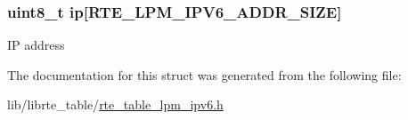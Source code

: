 \subsubsection[{ip}]{\setlength{\rightskip}{0pt plus 5cm}uint8\+\_\+t ip\mbox{[}R\+T\+E\+\_\+\+L\+P\+M\+\_\+\+I\+P\+V6\+\_\+\+A\+D\+D\+R\+\_\+\+S\+I\+Z\+E\mbox{]}}\label{structrte__table__lpm__ipv6__key_aa53c1fe193ed5311bd6c16153b939a10}
I\+P address 

The documentation for this struct was generated from the following file\+:\begin{DoxyCompactItemize}
\item 
lib/librte\+\_\+table/\hyperlink{rte__table__lpm__ipv6_8h}{rte\+\_\+table\+\_\+lpm\+\_\+ipv6.\+h}\end{DoxyCompactItemize}
